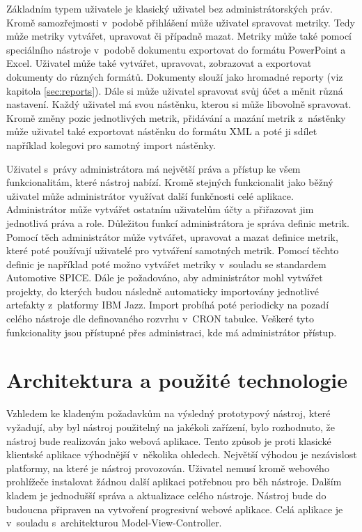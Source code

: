 \documentclass[czech,master]{diploma}
\begin{document}
Základním typem uživatele je klasický uživatel bez administrátorských práv. Kromě samozřejmosti v~podobě přihlášení může uživatel spravovat metriky. Tedy může metriky vytvářet, upravovat či případně mazat. Metriky může také pomocí speciálního nástroje v~podobě dokumentu exportovat do formátu PowerPoint a Excel. Uživatel může také vytvářet, upravovat, zobrazovat a exportovat dokumenty do různých formátů. Dokumenty slouží jako hromadné reporty (viz kapitola \ref{sec:reports}). Dále si může uživatel spravovat svůj účet a měnit různá nastavení. Každý uživatel má svou nástěnku, kterou si může libovolně spravovat. Kromě změny pozic jednotlivých metrik, přidávání a mazání metrik z~nástěnky může uživatel také exportovat nástěnku do formátu XML a poté ji sdílet například kolegovi pro samotný import nástěnky.

Uživatel s~právy administrátora má největší práva a přístup ke všem funkcionalitám, které nástroj nabízí. Kromě stejných funkcionalit jako běžný uživatel může administrátor využívat další funkčnosti celé aplikace. Administrátor může vytvářet ostatním uživatelům účty a přiřazovat jim jednotlivá práva a role. Důležitou funkcí administrátora je správa definic metrik. Pomocí těch administrátor může vytvářet, upravovat a mazat definice metrik, které poté používají uživatelé pro vytváření samotných metrik. Pomocí těchto definic je například poté možno vytvářet metriky v~souladu se standardem Automotive SPICE. Dále je požadováno, aby administrátor mohl vytvářet projekty, do kterých budou následně automaticky importovány jednotlivé artefakty z~platformy IBM Jazz. Import probíhá poté periodicky na pozadí celého nástroje dle definovaného rozvrhu v~CRON tabulce. Veškeré tyto funkcionality jsou přístupné přes administraci, kde má administrátor přístup.

\section{Architektura a použité technologie}
Vzhledem ke kladeným požadavkům na výsledný prototypový nástroj, které vyžadují, aby byl nástroj použitelný na jakékoli zařízení, bylo rozhodnuto, že nástroj bude realizován jako webová aplikace. Tento způsob je proti klasické klientské aplikace výhodnější v~několika ohledech. Největší výhodou je nezávislost platformy, na které je nástroj provozován. Uživatel nemusí kromě webového prohlížeče instalovat žádnou další aplikaci potřebnou pro běh nástroje. Dalším kladem je jednodušší správa a aktualizace celého nástroje. Nástroj bude do budoucna připraven na vytvoření progresivní webové aplikace. Celá aplikace je v~souladu s~architekturou Model-View-Controller.
\end{document}
